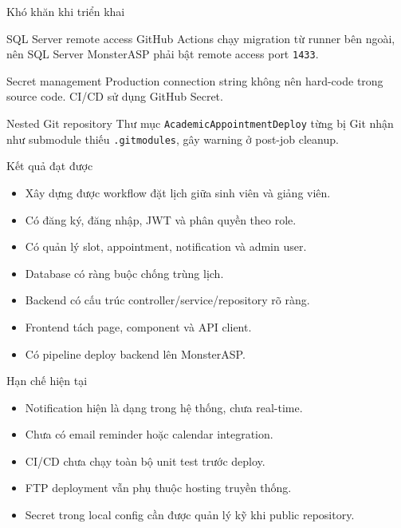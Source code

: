 \documentclass[aspectratio=169,11pt]{beamer}
\begin{document}
\begin{frame}{Khó khăn khi triển khai}
  \begin{block}{SQL Server remote access}
    GitHub Actions chạy migration từ runner bên ngoài, nên SQL Server MonsterASP phải bật remote access port \texttt{1433}.
  \end{block}

  \begin{block}{Secret management}
    Production connection string không nên hard-code trong source code. CI/CD sử dụng GitHub Secret.
  \end{block}

  \begin{block}{Nested Git repository}
    Thư mục \texttt{AcademicAppointmentDeploy} từng bị Git nhận như submodule thiếu \texttt{.gitmodules}, gây warning ở post-job cleanup.
  \end{block}
\end{frame}

\begin{frame}{Kết quả đạt được}
  \begin{itemize}
    \item Xây dựng được workflow đặt lịch giữa sinh viên và giảng viên.
    \item Có đăng ký, đăng nhập, JWT và phân quyền theo role.
    \item Có quản lý slot, appointment, notification và admin user.
    \item Database có ràng buộc chống trùng lịch.
    \item Backend có cấu trúc controller/service/repository rõ ràng.
    \item Frontend tách page, component và API client.
    \item Có pipeline deploy backend lên MonsterASP.
  \end{itemize}
\end{frame}

\begin{frame}{Hạn chế hiện tại}
  \begin{itemize}
    \item Notification hiện là dạng trong hệ thống, chưa real-time.
    \item Chưa có email reminder hoặc calendar integration.
    \item CI/CD chưa chạy toàn bộ unit test trước deploy.
    \item FTP deployment vẫn phụ thuộc hosting truyền thống.
    \item Secret trong local config cần được quản lý kỹ khi public repository.
  \end{itemize}
\end{frame}
\end{document}
